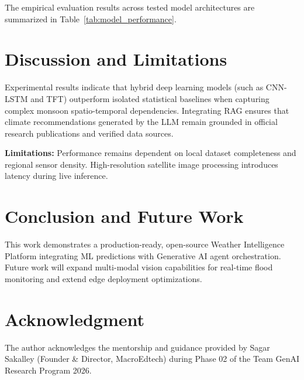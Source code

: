 \documentclass[10pt,journal,compsoc]{IEEEtran}
\begin{document}
The empirical evaluation results across tested model architectures are summarized in Table~\ref{tab:model_performance}.



\section{Discussion and Limitations}
Experimental results indicate that hybrid deep learning models (such as CNN-LSTM and TFT) outperform isolated statistical baselines when capturing complex monsoon spatio-temporal dependencies. Integrating RAG ensures that climate recommendations generated by the LLM remain grounded in official research publications and verified data sources.

\textbf{Limitations:} Performance remains dependent on local dataset completeness and regional sensor density. High-resolution satellite image processing introduces latency during live inference.

\section{Conclusion and Future Work}
This work demonstrates a production-ready, open-source Weather Intelligence Platform integrating ML predictions with Generative AI agent orchestration. Future work will expand multi-modal vision capabilities for real-time flood monitoring and extend edge deployment optimizations.

\section*{Acknowledgment}
The author acknowledges the mentorship and guidance provided by Sagar Sakalley (Founder \& Director, MacroEdtech) during Phase 02 of the Team GenAI Research Program 2026.
\end{document}
